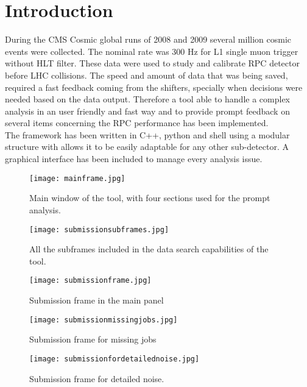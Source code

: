 \documentclass[11pt]{amsart}
\begin{document}
\section{Introduction}
During the CMS\cite{TDR} Cosmic global runs of 2008 and 2009 several million cosmic events were collected. The nominal rate was 300 Hz for L1 single muon trigger without HLT filter. These data were used to study and calibrate RPC detector before LHC collisions. The speed and amount of data that was being saved, required a fast feedback coming from the shifters, specially when decisions were needed based on the data output. Therefore a tool able to handle a complex analysis in an user friendly and fast way and to provide prompt feedback on several items concerning the RPC performance has been implemented.\\
The framework has been written in C++, python and shell using a modular structure with allows it to be easily adaptable for any other sub-detector.  A graphical interface has been included to manage every analysis issue.
\begin{figure}[!htb]
   \centering
   \texttt{[image: mainframe.jpg]} %
   \caption{Main window of the tool, with four sections used for the prompt analysis.}
   \label{fig:mainframe}
\end{figure} 
\begin{figure}[!htb]
   \centering
   \texttt{[image: submissionsubframes.jpg]} %
   \caption{All the subframes included in the data search capabilities of the tool.}
   \label{fig:searchsubframes}
\end{figure} 
\begin{figure}[htb]
   \centering
   \texttt{[image: submissionframe.jpg]} %
   \caption{Submission frame in the main panel}
   \label{fig:submission}
\end{figure}
\begin{figure}[htb]
   \centering
   \texttt{[image: submissionmissingjobs.jpg]} %
   \caption{Submission frame for missing jobs}
   \label{fig:missingjobs}
\end{figure}
\begin{figure}[htb] %
   \centering
   \texttt{[image: submissionfordetailednoise.jpg]} 
   \caption{Submission frame for detailed noise.}
   \label{fig:detailednoise}
\end{figure}
\end{document}
